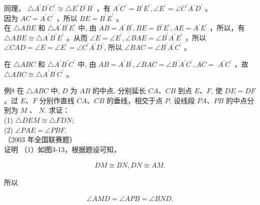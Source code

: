 \documentclass[10pt]{article}
\begin{document}
同理， $\triangle A^{\prime} D^{\prime} C^{\prime} \cong \triangle E^{\prime} D^{\prime} B^{\prime}$ ，有 $A^{\prime} C^{\prime}=B^{\prime} E^{\prime}, \angle E^{\prime}=\angle C^{\prime} A^{\prime} D^{\prime}$ 。\\
因为 $A C=A^{\prime} C^{\prime}$ ，所以 $B E=B^{\prime} E^{\prime}$ 。\\
在 $\triangle A B E$ 和 $\triangle A^{\prime} B^{\prime} E^{\prime}$ 中, 由 $A B=A^{\prime} B^{\prime}, B E=B^{\prime} E^{\prime}, A E=A^{\prime} E^{\prime}$ ，所以，有 $\triangle A B E \cong \triangle A^{\prime} B^{\prime} E^{\prime}$ 。从而 $\angle E=\angle E^{\prime}, \angle B A E=\angle B^{\prime} A^{\prime} E^{\prime}$ ，所以 $\angle C A D=\angle E=\angle E^{\prime}=\angle C^{\prime} A^{\prime} D^{\prime}$, 所以 $\angle B A C=\angle B^{\prime} A^{\prime} C^{\prime}$ 。

在 $\triangle A B C$ 和 $\triangle A^{\prime} B^{\prime} C^{\prime}$ 中, 由 $A B=A^{\prime} B^{\prime}, \angle B A C=\angle B^{\prime} A^{\prime} C^{\prime}, A C=$ $A^{\prime} C^{\prime}$ ，故 $\triangle A B C \cong \triangle A^{\prime} B^{\prime} C^{\prime}$ 。

例8 在 $\triangle A B C$ 中, $D$ 为 $A B$ 的中点, 分别延长 $C A 、 C B$ 到点 $E 、 F$, 使 $D E=D F$ 。过 $E 、 F$ 分别作直线 $C A 、 C B$ 的垂线，相交于点 $P$, 设线段 $P A 、 P B$ 的中点分别为 $M$ 、 $N$. 求证：\\
(1) $\triangle D E M \cong \triangle F D N$;\\
(2) $\angle P A E=\angle P B F$.\\
（2003 年全国联赛题）\\
证明 （1）如图3-13，根据题设可知，

\begin{align*}
D M \cong B N, D N \cong A M .
\end{align*}

所以

\begin{align*}
\angle A M D=\angle A P B=\angle B N D .
\end{align*}
\end{document}
